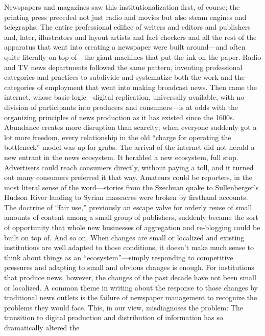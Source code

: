 Newspapers and magazines saw this institutionalization first, of course; the printing
press preceded not just radio and movies but also steam engines and telegraphs.
The entire professional edifice of writers and editors and publishers and,
later, illustrators and layout artists and fact checkers and all the rest of the apparatus
that went into creating a newspaper were built around—and often quite
literally on top of—the giant machines that put the ink on the paper. Radio and
TV news departments followed the same pattern, inventing professional categories
and practices to subdivide and systematize both the work and the categories
of employment that went into making broadcast news.
Then came the internet, whose basic logic—digital replication, universally available,
with no division of participants into producers and consumers—is at odds
with the organizing principles of news production as it has existed since the
1600s. Abundance creates more disruption than scarcity; when everyone suddenly
got a lot more freedom, every relationship in the old ``charge for operating
the bottleneck'' model was up for grabs.
The arrival of the internet did not herald a new entrant in the news ecosystem.
It heralded a new ecosystem, full stop. Advertisers could reach consumers directly,
without paying a toll, and it turned out many consumers preferred it that way.
Amateurs could be reporters, in the most literal sense of the word—stories from
the Szechuan quake to Sullenberger’s Hudson River landing to Syrian massacres
were broken by firsthand accounts. The doctrine of ``fair use,'' previously an
escape valve for orderly reuse of small amounts of content among a small group
of publishers, suddenly became the sort of opportunity that whole new businesses
of aggregation and re-blogging could be built on top of. And so on.
When changes are small or localized and existing institutions are well adapted
to those conditions, it doesn’t make much sense to think about things as an
``ecosystem''—simply responding to competitive pressures and adapting to small
and obvious changes is enough. For institutions that produce news, however, the
changes of the past decade have not been small or localized.
A common theme in writing about the response to those changes by traditional
news outlets is the failure of newspaper management to recognize the problems
they would face. This, in our view, misdiagnoses the problem: The transition to
digital production and distribution of information has so dramatically altered the

